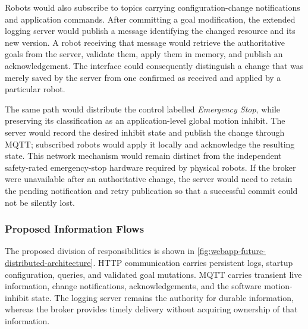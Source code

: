 Robots would also subscribe to topics carrying configuration-change notifications and application commands. After committing a goal modification, the extended logging server would publish a message identifying the changed resource and its new version. A robot receiving that message would retrieve the authoritative goals from the server, validate them, apply them in memory, and publish an acknowledgement. The interface could consequently distinguish a change that was merely saved by the server from one confirmed as received and applied by a particular robot.

The same path would distribute the control labelled \emph{Emergency Stop}, while preserving its classification as an application-level global motion inhibit. The server would record the desired inhibit state and publish the change through MQTT; subscribed robots would apply it locally and acknowledge the resulting state. This network mechanism would remain distinct from the independent safety-rated emergency-stop hardware required by physical robots. If the broker were unavailable after an authoritative change, the server would need to retain the pending notification and retry publication so that a successful commit could not be silently lost.

\subsubsection{Proposed Information Flows}

The proposed division of responsibilities is shown in \cref{fig:webapp-future-distributed-architecture}. HTTP communication carries persistent logs, startup configuration, queries, and validated goal mutations. MQTT carries transient live information, change notifications, acknowledgements, and the software motion-inhibit state. The logging server remains the authority for durable information, whereas the broker provides timely delivery without acquiring ownership of that information.

